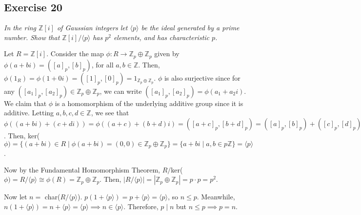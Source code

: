 \subsection*{Exercise 20}
\textit{In the ring $\mathbb{Z}[i]$ of Gaussian integers let $\langle p \rangle$ be the ideal generated by a prime number. Show that $\mathbb{Z}[i]/\langle p \rangle$ has $p^2$ elements, and has characteristic $p$.}

\vspace{5 mm}
Let $R = \mathbb{Z}[i]$. Consider the map $\phi: R \rightarrow \mathbb{Z}_p\oplus\mathbb{Z}_p$ given by $\phi(a+bi) = ([a]_p,[b]_p)$, for all $a,b \in \mathbb{Z}$. Then, $\phi(1_R) = \phi(1+0i) = ([1]_p,[0]_p) = 1_{\mathbb{Z}_p\oplus\mathbb{Z}_p}$. $\phi$ is also surjective since for any $([a_1]_p,[a_2]_p) \in \mathbb{Z}_p\oplus\mathbb{Z}_p$, we can write $([a_1]_p,[a_2]_p) = \phi(a_1 + a_2i)$. We claim that $\phi$ is a homomorphism of the underlying additive group since it is additive. Letting $a,b,c,d \in \mathbb{Z}$, we see that $\phi((a + bi)+(c+di))=\phi((a+c)+(b+d)i) = ([a+c]_p,[b+d]_p) = ([a]_p,[b]_p)+([c]_p,[d]_p)=\phi(a+bi)+\phi(c+di)$. Then, ker($\phi) = \{(a+bi) \in R \mid \phi(a+bi) = (0,0) \in \mathbb{Z}_p\oplus\mathbb{Z}_p \} = \{a+bi \mid a,b \in p\mathbb{Z} \} = \langle p \rangle$.

Now by the Fundamental Homomorphism Theorem, $R/$ker($\phi) = R/\langle p \rangle \cong \phi(R) = \mathbb{Z}_p\oplus\mathbb{Z}_p$. Then, $|R/\langle p \rangle| = |\mathbb{Z}_p\oplus\mathbb{Z}_p| = p\cdot p = p^2$.

Now let $n = $ char($R/\langle p \rangle$). $p(1 + \langle p \rangle) = p + \langle p \rangle = \langle p \rangle$, so $n \le p$. Meanwhile, $n(1 + \langle p \rangle) = n + \langle p \rangle = \langle p \rangle \implies n \in \langle p \rangle$. Therefore, $p \mid n$ but $n \le p \implies p = n$.